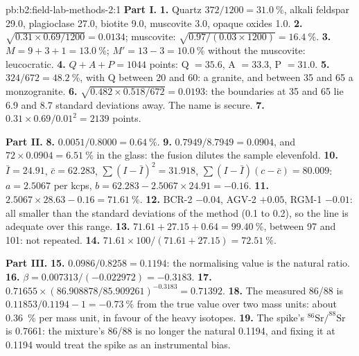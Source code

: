 \begin{solution}{pb:b2:field-lab-methods-2:1}
\noindent\textbf{Part I.}
\textbf{1.} Quartz $372/1200 = \qty{31.0}{\percent}$, alkali feldspar 29.0, plagioclase 27.0, biotite
9.0, muscovite 3.0, opaque oxides 1.0.
\textbf{2.} $\sqrt{0.31 \times 0.69/1200} = 0.0134$; muscovite: $\sqrt{0.97/(0.03 \times 1200)} =
\qty{16.4}{\percent}$.
\textbf{3.} $M = 9 + 3 + 1 = \qty{13.0}{\percent}$; $M' = 13 - 3 = \qty{10.0}{\percent}$ without the
muscovite: leucocratic.
\textbf{4.} $Q + A + P = 1044$ points: Q $= 35.6$, A $= 33.3$, P $= 31.0$.
\textbf{5.} $324/672 = \qty{48.2}{\percent}$, with Q between 20 and 60: a granite, and between 35 and
65 a monzogranite.
\textbf{6.} $\sqrt{0.482 \times 0.518/672} = 0.0193$: the boundaries at 35 and 65 lie 6.9 and 8.7
standard deviations away. The name is secure.
\textbf{7.} $0.31 \times 0.69/0.01^2 = 2139$ points.

\noindent\textbf{Part II.}
\textbf{8.} $0.0051/0.8000 = \qty{0.64}{\percent}$.
\textbf{9.} $0.7949/8.7949 = 0.0904$, and $72 \times 0.0904 = \qty{6.51}{\percent}$  in the
glass: the fusion dilutes the sample elevenfold.
\textbf{10.} $\bar I = 24.91$, $\bar c = 62.283$, $\sum(I - \bar I)^2 = 31.918$, $\sum(I - \bar I)(c -
\bar c) = 80.009$: $a = 2.5067$ per kcps, $b = 62.283 - 2.5067 \times 24.91 = -0.16$.
\textbf{11.} $2.5067 \times 28.63 - 0.16 = \qty{71.61}{\percent}$.
\textbf{12.} BCR-2 $-0.04$, AGV-2 $+0.05$, RGM-1 $-0.01$: all smaller than the standard deviations
of the method (0.1 to 0.2), so the line is adequate over this range.
\textbf{13.} $71.61 + 27.15 + 0.64 = \qty{99.40}{\percent}$, between 97 and 101: not repeated.
\textbf{14.} $71.61 \times 100/(71.61 + 27.15) = \qty{72.51}{\percent}$.

\noindent\textbf{Part III.}
\textbf{15.} $0.0986/0.8258 = 0.1194$: the normalising value is the natural ratio.
\textbf{16.} $\beta = 0.007313/(-0.022972) = -0.3183$.
\textbf{17.} $0.71655 \times (86.908878/85.909261)^{-0.3183} = 0.71392$.
\textbf{18.} The measured 86/88 is $0.11853/0.1194 - 1 = \qty{-0.73}{\percent}$ from the true value
over two mass units: about \qty{0.36}{\percent} per mass unit, in favour of the heavy isotopes.
\textbf{19.} The spike's $^{86}\mathrm{Sr}/^{88}\mathrm{Sr}$ is 0.7661: the mixture's 86/88 is no
longer the natural 0.1194, and fixing it at 0.1194 would treat the spike as an instrumental bias.


\end{solution}

